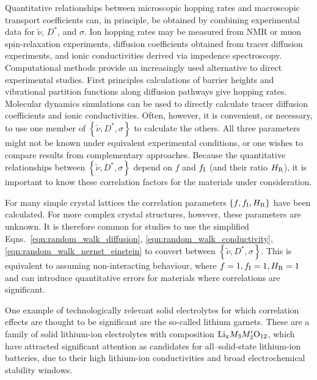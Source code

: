 \documentclass[aps,prb,twocolumn,superscriptaddress,reprint]{revtex4-1}
\newcommand{\set}[1]{\left\{#1\right\}}
\newcommand{\hrpa}{{\widetilde{\nu}}}
\begin{document}
Quantitative relationships between microscopic hopping rates and macroscopic transport coefficients can, in principle, be obtained by combining experimental data for $\hrpa$, $D^*$, and $\sigma$. 
Ion hopping rates may be measured from NMR or muon spin-relaxation experiments,\cite{WilkeningEtAl_PhysRevLett2006, RuprechtEtAl_PhysChemChemPhys2012, Enciso-MaldonadoEtAl_ChemMater2015,Santibanez-MendietaEtAl_ChemMater2016, NozakiEtAl_SolStatIonics2014,AmoresEtAl_JMaterChemA2016} diffusion coefficients obtained from tracer diffusion experiments,\cite{BaylissEtAl_AdvEnergyMater2014} and ionic conductivities derived via impedence spectroscopy.\cite{ZeierEtAl_ACSApplMaterInt2014,Lopez-BermudezEtAl_2016} Computational methods provide an increasingly used alternative to direct experimental studies. 
First principles calculations of barrier heights and vibrational partition functions along diffusion pathways give hopping rates.\cite{VanDerVenEtAl_PhysRevB2001, MantinaEtAl_PhysRevLett2008} Molecular dynamics simulations can be used to directly calculate tracer diffusion coefficients and ionic conductivities.\cite{MorganAndMadden_JPhysCondensMat2012} Often, however, it is convenient, or necessary, to use one member of $\set{\hrpa,D^*,\sigma}$ to calculate the others. 
All three parameters might not be known under equivalent experimental conditions, or one wishes to compare results from complementary approaches. 
Because the quantitative relationships between $\set{\hrpa,D^*,\sigma}$ depend on $f$ and $f_{\mathrm{I}}$ (and their ratio $H_{\mathrm{R}}$), it is important to know these correlation factors for the materials under consideration.

For many simple crystal lattices the correlation parameters $\set{f, f_\m{I}, H_\m{R}}$ have been calculated.\cite{Friauf_JApplPhys1962,Murch_SolStatIonics1982} For more complex crystal structures, however, these parameters are unknown. 
It is therefore common for studies to use the simplified Eqns.\ \ref{eqn:random_walk_diffusion}, \ref{eqn:random_walk_conductivity}, \ref{eqn:random_walk_nernst_einstein} to convert between $\set{\hrpa,D^*,\sigma}$. This is equivalent to assuming non-interacting behaviour, where $f=1, f_{\mathrm{I}}=1, H_{\mathrm{R}}=1$ and can introduce quantitative errors for materials where correlations are significant.

One example of technologically relevant solid electrolytes for which correlation effects are thought to be significant are the so-called lithium garnets. 
These are a family of solid lithium-ion electrolytes with composition $\mathrm{Li}_{\mathrm{x}}M_3M^\prime_2\mathrm{O}_{12}$,\cite{ThangaduraiEtAl_JAmCeramSoc2003, ThangaduraiEtAl_JPhysChemLett2015} which have attracted significant attention as candidates for all--solid-state lithium-ion batteries, due to their high lithium-ion conductivities and broad electrochemical stability windows.\cite{BachmanEtAl_ChemRev2016} 
\end{document}
